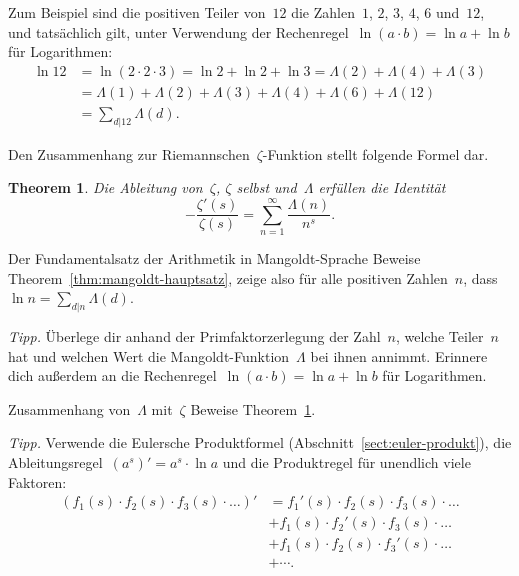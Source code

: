 \documentclass[twoside]{../zirkelblatt1415}
\theoremstyle{definition}
\theoremstyle{plain}
\newtheorem{thm}[defn]{Theorem}
\theoremstyle{remark}
\begin{document}
Zum Beispiel sind die positiven Teiler von~$12$ die Zahlen~$1$, $2$, $3$, $4$,
$6$ und~$12$, und tatsächlich gilt, unter Verwendung der Rechenregel~$\ln(a
\cdot b) = \ln a + \ln b$ für Logarithmen:
\begin{align*}
  \ln 12 &= \ln(2 \cdot 2 \cdot 3) =
  \ln 2 + \ln 2 + \ln 3 =
  \Lambda(2) + \Lambda(4) + \Lambda(3) \\
  &= \Lambda(1) + \Lambda(2) + \Lambda(3) + \Lambda(4) + \Lambda(6) +
  \Lambda(12) \\
  &= \sum_{d|12} \Lambda(d).
\end{align*}

Den Zusammenhang zur Riemannschen~$\zeta$-Funktion stellt folgende Formel dar.

\begin{thm}\label{thm:mangoldt-zeta}
Die Ableitung von~$\zeta$, $\zeta$ selbst und~$\Lambda$ erfüllen
die Identität
\[ -\frac{\zeta'(s)}{\zeta(s)} = \sum_{n=1}^\infty \frac{\Lambda(n)}{n^s}. \]
\end{thm}

\begin{aufgabe}{Der Fundamentalsatz der Arithmetik in Mangoldt-Sprache}
Beweise Theorem~\ref{thm:mangoldt-hauptsatz}, zeige also für alle positiven
Zahlen~$n$, dass~$\ln n = \sum_{d|n} \Lambda(d)$.

\emph{Tipp.} Überlege dir anhand der Primfaktorzerlegung der Zahl~$n$, welche
Teiler~$n$ hat und welchen Wert die Mangoldt-Funktion~$\Lambda$ bei ihnen
annimmt. Erinnere dich außerdem an die Rechenregel~$\ln(a \cdot b) = \ln a +
\ln b$ für Logarithmen.
\end{aufgabe}

\begin{aufgabe}{Zusammenhang von~$\Lambda$ mit~$\zeta$}
Beweise Theorem~\ref{thm:mangoldt-zeta}.

\emph{Tipp.} Verwende die Eulersche Produktformel
(Abschnitt~\ref{sect:euler-produkt}), die Ableitungsregel~$(a^s)' = a^s \cdot
\ln a$ und die Produktregel für unendlich viele Faktoren:
\begin{align*}
  (f_1(s) \cdot f_2(s) \cdot f_3(s) \cdot \ldots)' &=
  f_1'(s) \cdot f_2(s) \cdot f_3(s) \cdot \ldots \\
  &\mathrel{+} f_1(s) \cdot f_2'(s) \cdot f_3(s) \cdot \ldots \\
  &\mathrel{+} f_1(s) \cdot f_2(s) \cdot f_3'(s) \cdot \ldots \\
  &\mathrel{+} \cdots.
\end{align*}
\vspace{-2em}
\end{aufgabe}
\end{document}
